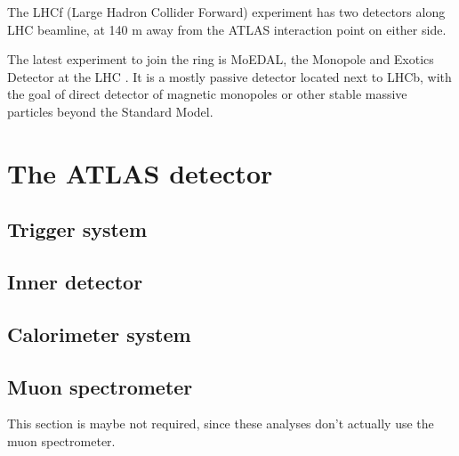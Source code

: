 The LHCf (Large Hadron Collider Forward) experiment \cite{Adriani:2008zz} has two detectors along LHC beamline, at 140 m away from the ATLAS interaction point on either side.

The latest experiment to join the ring is MoEDAL, the Monopole and Exotics Detector at the LHC \cite{Acharya:2014nyr}. It is a mostly passive detector located next to LHCb, with the goal of direct detector of magnetic monopoles or other stable massive particles beyond the Standard Model.

\section{The ATLAS detector}
\label{sec:atlas}

\subsection{Trigger system}
\subsection{Inner detector}
\subsection{Calorimeter system}
\subsection{Muon spectrometer}
This section is maybe not required, since these analyses don't actually use the muon spectrometer.

